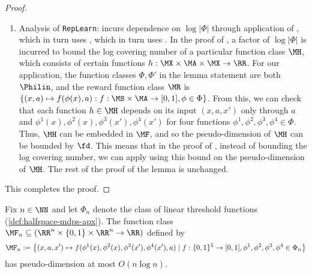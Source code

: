\begin{proof}
\begin{enumerate}
\item Analysis of \texttt{RepLearn}: \cite[Lemma F.1]{mhammedi2023efficient} incurs dependence on $\log |\Phi|$ through application of \cite[Lemma 14]{modi2021model}, which in turn uses \cite[Lemma 17]{modi2021model}, which in turn uses \cite[Lemma 34]{modi2021model}. In the proof of \cite[Lemma 34]{modi2021model}, a factor of $\log |\Phi|$ is incurred to bound the log covering number of a particular function class $\MH$, which consists of certain functions $h: \MX\times\MA\times\MX\to\RR$. For our application, the function classes $\Phi,\Phi'$ in the lemma statement are both $\Philin$, and the reward function class $\MR$ is $\{(x,a) \mapsto f(\phi(x),a): f:\MS\times\MA \to [0,1], \phi\in\Phi\}$. From this, we can check that each function $h \in \MH$ depends on its input $(x,a,x')$ only through $a$ and $\phi^1(x),\phi^2(x),\phi^3(x'),\phi^4(x')$ for four functions $\phi^1,\phi^2,\phi^3,\phi^4 \in \Phi$. Thus, $\MH$ can be embedded in $\MF$, and so the pseudo-dimension of $\MH$ can be bounded by $\fd$. This means that in the proof of \cite[Lemma 34]{modi2021model}, instead of bounding the log covering number, we can apply \cite[Corollary 43]{modi2021model} using this bound on the pseudo-dimension of $\MH$. The rest of the proof of the lemma is unchanged.
\end{enumerate}
This completes the proof.
\end{proof}



\begin{lemma}\label{lemma:halfspace-pdim}
Fix $n \in \NN$ and let $\Phi_n$ denote the class of linear threshold functions (\cref{def:halfspace-mdps-apx}). The function class $\MF_n \subseteq (\RR^n\times\{0,1\}\times\RR^n \to \RR)$ defined by
\[\MF_n := \left\{(x,a,x') \mapsto f(\phi^1(x),\phi^2(x),\phi^3(x'),\phi^4(x'),a) \mid{} f: \{0,1\}^5 \to [0,1], \phi^1,\phi^2,\phi^3,\phi^4 \in \Phi_n\right\}\]
has pseudo-dimension at most $O(n\log n)$.
\end{lemma}

